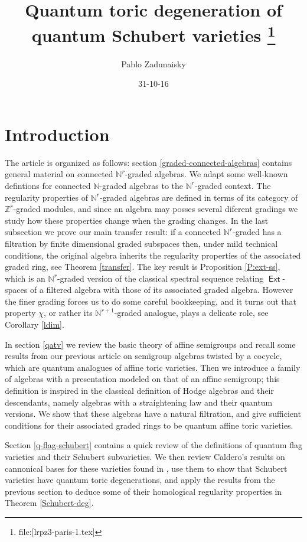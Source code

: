 \documentclass[11pt,fleqn]{article}
\title{
Quantum toric degeneration of quantum Schubert varieties
\footnote{file:[lrpz3-paris-1.tex]}
}
\date{31-10-16}
\author{Pablo Zadunaisky}
\newcommand\NN{\mathbb N}
\newcommand\ZZ{\mathbb Z}
\DeclareMathOperator\Ext{\mathsf{Ext}}
\begin{document}
\maketitle


\section{Introduction}

The article is organized as follows: section \ref{graded-connected-algebras} 
contains general material on connected $\NN^r$-graded algebras. We adapt some 
well-known defintions for connected $\NN$-graded algebras to the 
$\NN^r$-graded context. The regularity properties of $\NN^r$-graded algebras 
are defined in terms of its category of $\ZZ^r$-graded modules, and since an 
algebra may posses several diferent gradings we study how these properties 
change when the grading changes. In the last subsection we 
prove our main transfer result: if a connected $\NN^r$-graded has a filtration 
by finite dimensional graded subspaces then, under mild technical conditions, 
the original algebra inherits the regularity properties of the associated 
graded ring, see Theorem \ref{transfer}. The key result is Proposition 
\ref{P:ext-ss}, which is an $\NN^r$-graded version of the classical spectral 
sequence relating $\Ext$-spaces of a filtered algebra with those of its 
associated graded algebra. However the finer grading forces us 
to do some careful bookkeeping, and it turns out that property $\chi$, or 
rather its $\NN^{r+1}$-graded analogue, plays a delicate role, see Corollary 
\ref{ldim}.

In section \ref{qatv} we review the basic theory of affine semigroups and 
recall some results from our previous article \cite{RZ2} on semigroup algebras 
twisted by a cocycle, which are quantum analogues of affine toric varieties. 
Then we introduce a family of algebras with a presentation modeled on that of 
an affine semigroup; this definition is inspired in the classical definition 
of Hodge algebras and their descendants, namely algebras with a straightening 
law and their quantum versions. We show that these algebras have a natural 
filtration, and give  sufficient conditions for their associated graded rings 
to be quantum affine toric varieties.

Section \ref{q-flag-schubert} contains a quick review of the definitions of 
quantum flag varieties and their Schubert subvarieties. We then review 
Caldero's results on cannonical bases for these varieties found in \cite{C}, 
use them to show that Schubert varieties have quantum toric degenerations, and 
apply the results from the previous section to deduce some of their 
homological regularity properties in Theorem \ref{Schubert-deg}. 
\end{document}
